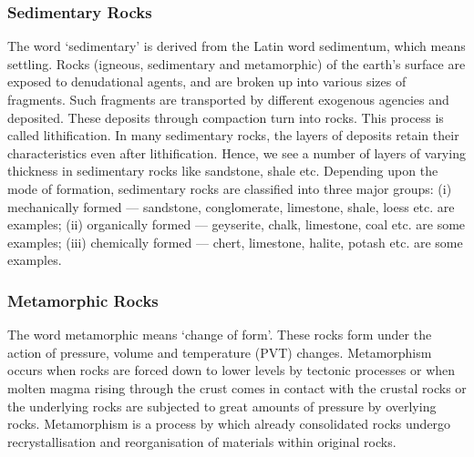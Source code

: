 \documentclass[8pt, a4paper, oneside, twocolumn]{extarticle}
\begin{document}
\subsubsection{Sedimentary Rocks}
The word ‘sedimentary’ is derived from the Latin word sedimentum, which means settling. Rocks (igneous, sedimentary and metamorphic) of the earth’s surface are exposed to denudational agents, and are broken up into various sizes of fragments. Such fragments are transported by different exogenous agencies and deposited. These deposits through compaction turn into rocks. This process is called lithification. In many sedimentary rocks, the layers of deposits retain their characteristics even after lithification. Hence, we see a number of layers of varying thickness in sedimentary rocks like sandstone, shale etc. Depending upon the mode of formation, sedimentary rocks are classified into three major groups: (i) mechanically formed — sandstone, conglomerate, limestone, shale, loess etc. are examples; (ii) organically formed — geyserite, chalk, limestone, coal etc. are some examples; (iii) chemically formed — chert, limestone, halite, potash etc. are some examples.

\subsubsection{Metamorphic Rocks}

The word metamorphic means ‘change of form’. These rocks form under the action of pressure, volume and temperature (PVT) changes. Metamorphism occurs when rocks are forced down to lower levels by tectonic processes or when molten magma rising through the crust comes in contact with the crustal rocks or the underlying rocks are subjected to great amounts of pressure by overlying rocks. Metamorphism is a process by which already consolidated rocks undergo recrystallisation and reorganisation of materials within original rocks.
\end{document}
